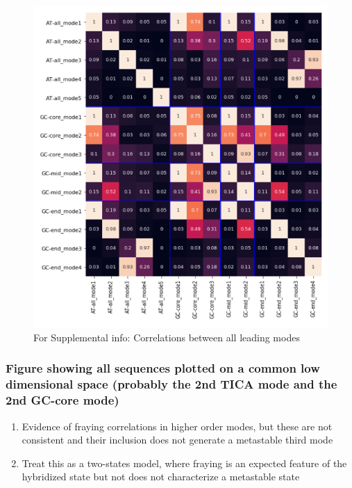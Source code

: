 \documentclass[journal=jpcbfk,manuscript=article]{achemso}
\begin{document}
\begin{figure}[ht!]
	\begin{center}
        \includegraphics[width=\textwidth]{Figs/skeleton/all_modes_correlations.PNG}
        \caption{For Supplemental info: Correlations between all leading modes}
        \label{fig:all_modes}
	\end{center}
\end{figure}

\subsubsection{\label{sec:Results}Figure showing all sequences plotted on a common low dimensional space (probably the 2nd TICA mode and the 2nd GC-core mode)}

\begin{enumerate}
	\item Evidence of fraying correlations in higher order modes, but these are not consistent and their inclusion does not generate a metastable third mode
	\item Treat this as a two-states model, where fraying is an expected feature of the hybridized state but not does not characterize a metastable state
\end{enumerate}
    
\end{document}
